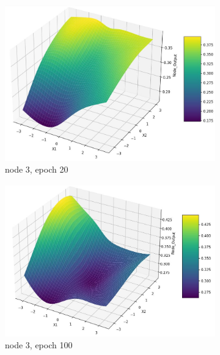 \documentclass[11pt]{article}
\begin{document}
\begin{figure}[h!]
\begin{subfigure}[b]{0.30\textwidth}
	\includegraphics[scale=0.14]{output_n3_e20.jpg}
	\caption{node 3, epoch 20}
	\label{fig:fig2.1.3.13}
	\end{subfigure}
	\begin{subfigure}[b]{0.45\textwidth}
	\centering
	\includegraphics[scale=0.14]{output_n3_e100.jpg}
	\caption{node 3, epoch 100}
	\label{fig:fig2.1.3.14}
	\end{subfigure}
	\begin{subfigure}[b]{0.45\textwidth}
	\centering

\end{subfigure}
\end{figure}
\end{document}
